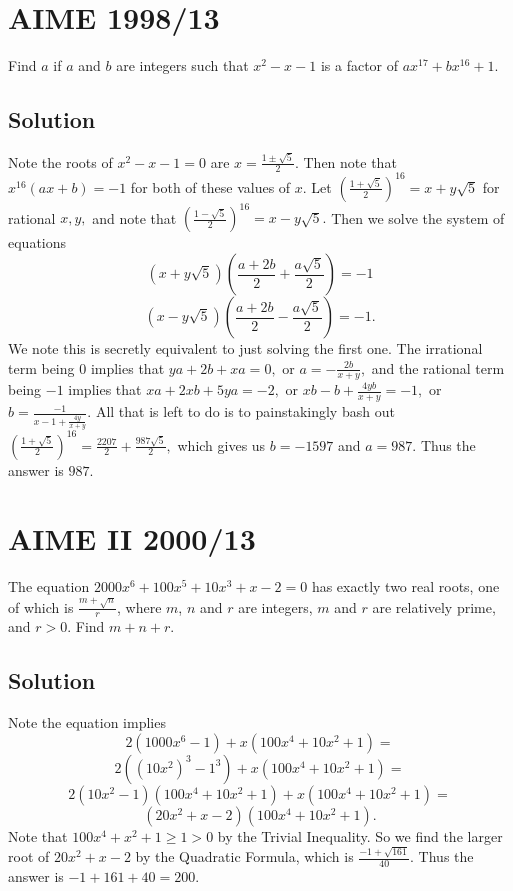 \documentclass[mast]{lucky}
\begin{document}
\pagebreak\section{AIME 1998/13}

Find $a$ if $a$ and $b$ are integers such that $x^2 - x - 1$ is a factor of $ax^{17} + bx^{16} + 1$.

\subsection{Solution}

Note the roots of $x^2-x-1=0$ are $x=\frac{1\pm\sqrt{5}}{2}.$ Then note that $x^{16}(ax+b)=-1$ for both of these values of $x.$ Let $(\frac{1+\sqrt{5}}{2})^{16}=x+y\sqrt{5}$ for rational $x,y,$ and note that $(\frac{1-\sqrt{5}}{2})^{16}=x-y\sqrt{5}.$ Then we solve the system of equations
    \[(x+y\sqrt{5})(\frac{a+2b}{2}+\frac{a\sqrt{5}}{2})=-1\]
    \[(x-y\sqrt{5})(\frac{a+2b}{2}-\frac{a\sqrt{5}}{2})=-1.\]
    We note this is secretly equivalent to just solving the first one. The irrational term being $0$ implies that $ya+2b+xa=0,$ or $a=-\frac{2b}{x+y},$ and the rational term being $-1$ implies that $xa+2xb+5ya=-2,$ or $xb-b+\frac{4yb}{x+y}=-1,$ or $b=\frac{-1}{x-1+\frac{4y}{x+y}}.$ All that is left to do is to painstakingly bash out $(\frac{1+\sqrt{5}}{2})^{16}=\frac{2207}{2}+\frac{987\sqrt{5}}{2},$ which gives us $b=-1597$ and $a=987.$ Thus the answer is $987.$

\pagebreak\section{AIME II 2000/13}

The equation $2000x^6+100x^5+10x^3+x-2=0$ has exactly two real roots, one of which is $\frac{m+\sqrt{n}}r$, where $m$, $n$ and $r$ are integers, $m$ and $r$ are relatively prime, and $r>0$. Find $m+n+r$.

\subsection{Solution}

Note the equation implies
\[2(1000x^6-1)+x(100x^4+10x^2+1)=\]
\[2((10x^2)^3-1^3)+x(100x^4+10x^2+1)=\]
\[2(10x^2-1)(100x^4+10x^2+1)+x(100x^4+10x^2+1)=\]
\[(20x^2+x-2)(100x^4+10x^2+1).\]
Note that $100x^4+x^2+1\geq 1>0$ by the Trivial Inequality. So we find the larger root of $20x^2+x-2$ by the Quadratic Formula, which is $\frac{-1+\sqrt{161}}{40}.$ Thus the answer is $-1+161+40=200.$
\end{document}
